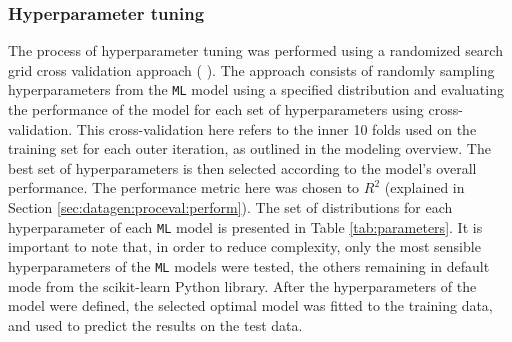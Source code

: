 \documentclass[12pt]{article}
\begin{document}
\subsubsection{Hyperparameter tuning} \label{sec:datagen:proceval:partun}

\par The process of hyperparameter tuning was performed using a randomized search grid cross validation approach (\cite{bergstra2012} ). The approach consists of randomly  sampling hyperparameters from the \texttt{ML} model using a specified distribution and evaluating the performance of the model for each set of hyperparameters using cross-validation. This cross-validation here refers to the inner 10 folds used on the training set for each outer iteration, as outlined in the modeling overview. The best set of hyperparameters is then selected according to the model's overall performance. The performance metric here was chosen to $R^2$ (explained in Section \ref{sec:datagen:proceval:perform}). The set of distributions for each hyperparameter of each \texttt{ML} model is presented in Table \ref{tab:parameters}. It is important to note that, in order to reduce complexity, only the most sensible hyperparameters of the \texttt{ML} models were tested, the others remaining in default mode from the scikit-learn Python library. After the hyperparameters of the model were defined, the selected optimal model was fitted to the training data, and used to predict the results on the test data.
\end{document}

